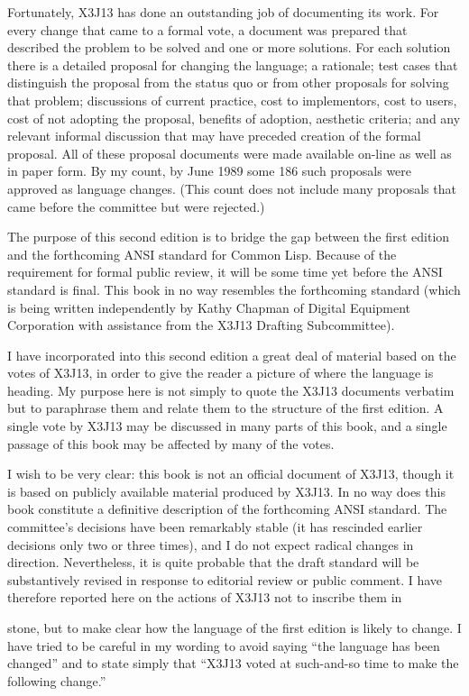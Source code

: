 Fortunately, X3J13 has done an outstanding job of documenting its work.
For every change that came to a formal vote, a document was prepared
that described the problem to be solved and one or more solutions.
For each solution there is a detailed proposal for changing the
language; a rationale; test cases that distinguish the proposal
from the status quo or from other proposals for solving that problem;
discussions of current practice, cost to implementors, cost to users,
cost of not adopting the proposal, benefits of adoption,
aesthetic criteria; and any relevant informal discussion that may have 
preceded creation of the formal proposal.  All of these proposal
documents were made available on-line as well as in paper form.
By my count, by June 1989 some
186 such proposals were approved as language changes.
(This count does not include many proposals that came before the committee
but were rejected.)

The purpose of this second edition is to bridge the gap between the
first edition and the forthcoming ANSI standard for Common Lisp.
Because of the requirement for formal public review,
it will be some time yet before the ANSI standard is final.
This book in no way resembles the forthcoming standard (which
is being written independently
by Kathy Chapman of Digital Equipment Corporation with assistance
from the X3J13 Drafting Subcommittee).

I have incorporated into this second edition
a great deal of material based on the votes of X3J13,
in order to give the reader a picture of where the language is heading.
My purpose here is not simply to quote the X3J13 documents verbatim
but to paraphrase them and relate them to the structure of the first
edition.  A single vote by X3J13 may be discussed in many parts of this book,
and a single passage of this book may be affected by many of the votes.

I wish to be very clear: this book is not an official document
of X3J13, though it is based on publicly available material
produced by X3J13.  In no way does this book constitute a definitive
description of the forthcoming ANSI standard.  The
committee's decisions have been remarkably stable (it has rescinded
earlier decisions only two or three times), and I do not
expect radical changes in direction.
Nevertheless, it is quite probable
that the draft standard will be substantively revised in response to
editorial review or public comment.
I have therefore reported here on the actions of X3J13 not to
inscribe them in \strut stone, but to make clear how the language
of the first edition is likely to change.
I have tried to be careful
in my wording to avoid saying ``the language has been changed''
and to state simply that
``X3J13 voted at such-and-so time to make the following change.''

